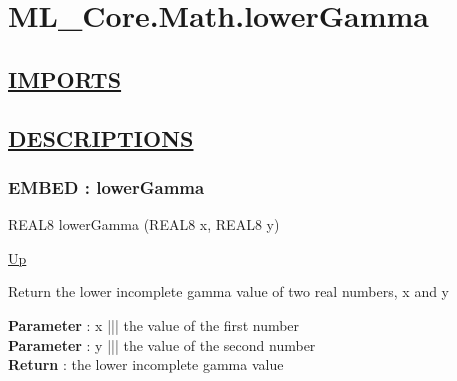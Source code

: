 \chapter*{ML\_Core.Math.lowerGamma}
\hypertarget{ecldoc:toc:ML_Core.Math.lowerGamma}{}

\section*{\underline{IMPORTS}}

\section*{\underline{DESCRIPTIONS}}
\subsection*{EMBED : lowerGamma}
\hypertarget{ecldoc:ml_core.math.lowergamma}{}
\begin{minipage}[t]{\textwidth}
\begin{flushleft}
REAL8 lowerGamma (REAL8 x, REAL8 y)
\end{flushleft}
\end{minipage}
\hyperlink{ecldoc:toc:ML_Core/Math}{Up}

\par
Return the lower incomplete gamma value of two real numbers, x and y
\par
\textbf{Parameter} : x ||| the value of the first number \\
\textbf{Parameter} : y ||| the value of the second number \\
\textbf{Return} : the lower incomplete gamma value \\
